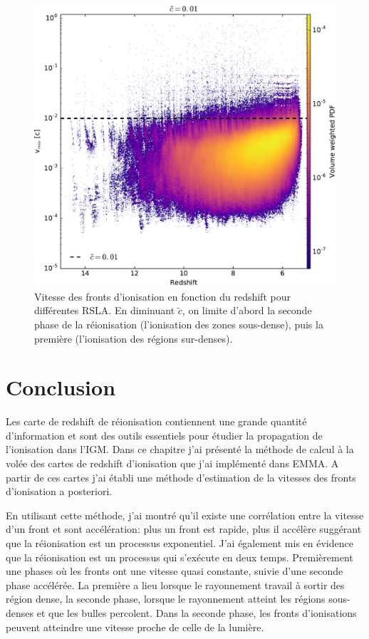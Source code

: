 \begin{figure}
        \includegraphics[height=0.3\textheight]{img/04_mapreio/speedreio_z_c001.pdf} 
        \caption[Évolution de la vitesse des fronts - histogrammes]{Vitesse des fronts d'ionisation en fonction du redshift pour différentes \ac{RSLA}.
        En diminuant $\tilde{c}$, on limite d'abord la seconde phase de la réionisation (l'ionisation des zones sous-dense), puis la première (l'ionisation des régions sur-denses).
 		\label{fig:vreioz} }
\end{figure}




\clearpage
\section{Conclusion}

Les carte de redshift de réionisation contiennent une grande quantité d'information et sont des outils essentiels pour étudier la propagation de l'ionisation dans l'\ac{IGM}.
Dans ce chapitre j'ai présenté la méthode de calcul à la volée des cartes de redshift d'ionisation que j'ai implémenté dans EMMA.
A partir de ces cartes j'ai établi une méthode d’estimation de la vitesses des fronts d'ionisation a posteriori.

En utilisant cette méthode, j'ai montré qu'il existe une corrélation entre la vitesse d'un front et sont accélération: plus un front est rapide, plus il accélère suggérant que la réionisation est un processus exponentiel.
J'ai également mis en évidence que la réionisation est un processus qui s’exécute en deux temps.
Premièrement une phases où les fronts ont une vitesse quasi constante, suivie d'une seconde phase accélérée.
La première a lieu lorsque le rayonnement travail à sortir des région dense, la seconde phase, lorsque le rayonnement atteint les régions sous-denses et que les bulles percolent.
Dans la seconde phase, les fronts d'ionisations peuvent atteindre une vitesse proche de celle de la lumière.

